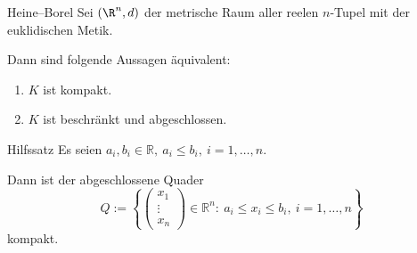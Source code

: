 \begin{satz}{Heine--Borel}
    Sei $(\R^n, d)$ der metrische Raum aller reelen $n$-Tupel mit der euklidischen Metik.

    Dann sind folgende Aussagen äquivalent:
    \begin{enumerate}
        \item[(i)] $K$ ist kompakt.
        \item[(ii)] $K$ ist beschränkt und abgeschlossen.
    \end{enumerate}
\end{satz}

\begin{satz}{Hilfssatz}
    Es seien $a_i,b_i\in\mathbb{R},\ a_i\le b_i,\ i=1,\dots,n.$

    Dann ist der abgeschlossene Quader
    $$
    Q:=\left\{\begin{pmatrix} x_1\\ \vdots\\ x_n\end{pmatrix}\in\mathbb{R}^n:\ a_i\le x_i\le b_i,\ i=1,\dots,n\right\}
    $$
    kompakt.
\end{satz}